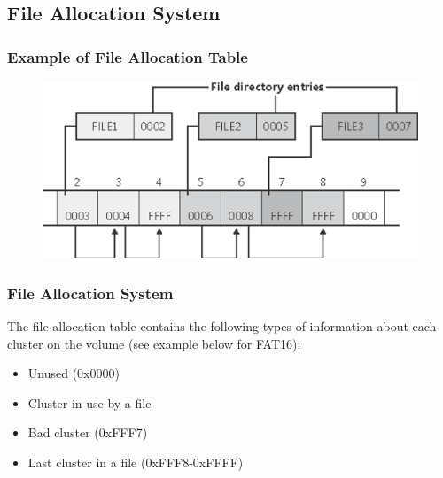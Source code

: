 \subsection{File Allocation System} %
\begin{frame}[fragile]
    \frametitle{Example of File Allocation Table}
    \begin{figure}
  \includegraphics[width=0.9\linewidth]{figs/FAT-example.png}
  \end{figure}
\end{frame}
% 
% 
\begin{frame}[fragile]
    \frametitle{File Allocation System}
    The file allocation table contains the following {\color{red}types} of information about each cluster on the volume (see example below for FAT16):

    \begin{itemize}
        \item Unused (0x0000)
        \item Cluster in use by a file \pause
        \item Bad cluster (0xFFF7)
        \item Last cluster in a file (0xFFF8-0xFFFF)
    \end{itemize}
\end{frame}
% 
